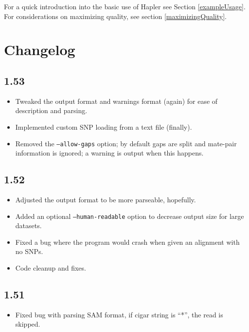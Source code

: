 \documentclass[11pt]{llncs}
\begin{document}
For a quick introduction into the basic use of Hapler see Section \ref{exampleUsage}. For considerations on maximizing quality, see section 
\ref{maximizingQuality}.






\newpage
\section{Changelog}
\label{changelog}


	  \subsection*{1.53}
\begin{itemize}	  
\item Tweaked the output format and warnings format (again) for ease of description and parsing.
\item Implemented custom SNP loading from a text file (finally).
\item Removed the \texttt{--allow-gaps} option; by default gaps are split and mate-pair information is ignored; a warning is output when this happens.
\end{itemize}



	  \subsection*{1.52}
\begin{itemize}	  
\item Adjusted the output format to be more parseable, hopefully.
\item Added an optional \texttt{--human-readable} option to decrease output size for large datasets.
\item Fixed a bug where the program would crash when given an alignment with no SNPs.
\item Code cleanup and fixes.
\end{itemize}

	\subsection*{1.51}
\begin{itemize}
\item Fixed bug with parsing SAM format, if cigar string is ``*'', the read is skipped.
\end{itemize}
\end{document}
